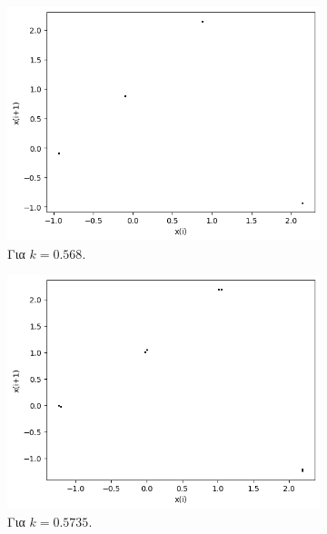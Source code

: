 \begin{figure}[h!]
\begin{subfigure}[c]{0.4\textwidth}
		\includegraphics[width=\textwidth]{LateX images/graphs/k0568}
		\caption{Για $k=0.568$.}
		\label{f:k12}
	\end{subfigure}
	\hfill
	\begin{subfigure}[c]{0.4\textwidth}
		\centering
		\includegraphics[width=\textwidth]{LateX images/graphs/k05735}
		\caption{Για $k=0.5735$.}
		\label{f:k13}
	\end{subfigure}
	\hfill
	\begin{subfigure}[c]{0.4\textwidth}
		\centering

\end{subfigure}
\end{figure}
